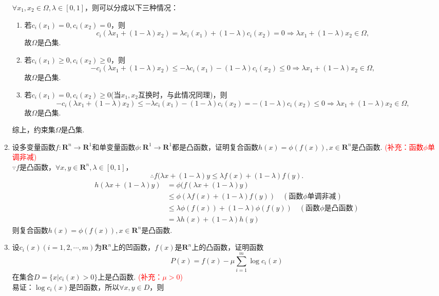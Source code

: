 \begin{enumerate}
    \pro $\forall x_1,x_2 \in \varOmega, \lambda \in [0,1]$，则可以分成以下三种情况：
    \begin{enumerate}[label=(\arabic*)]
        \item 若$c_i(x_1)=0,c_i(x_2)=0$，则
        \[c_i(\lambda x_1 + (1-\lambda)x_2) = \lambda c_i(x_1) + (1- \lambda)c_i(x_2) = 0 \Rightarrow \lambda x_1 + (1-\lambda)x_2 \in \varOmega,\]
        故$\varOmega$是凸集.
        \item 若$c_i(x_1)\geqslant 0,c_i(x_2)\geqslant 0$，则
        \[-c_i(\lambda x_1 + (1-\lambda)x_2) \leqslant -\lambda c_i(x_1) - (1- \lambda)c_i(x_2) \leqslant 0 \Rightarrow \lambda x_1 + (1-\lambda)x_2 \in \varOmega,\]
        故$\varOmega$是凸集.
        \item 若$c_i(x_1)= 0,c_i(x_2)\geqslant 0$(当$x_1,x_2$互换时，与此情况同理)，则
        \[-c_i(\lambda x_1 + (1-\lambda)x_2) \leqslant -\lambda c_i(x_1) - (1- \lambda)c_i(x_2) = - (1- \lambda)c_i(x_2) \leqslant 0 \Rightarrow \lambda x_1 + (1-\lambda)x_2 \in \varOmega,\]
        故$\varOmega$是凸集.
    \end{enumerate}
    综上，约束集$\varOmega$是凸集.
    \item 设多变量函数$f: \textbf{R}^n \to \textbf{R}^1$和单变量函数$\phi: \textbf{R}^1 \to \textbf{R}^1$都是凸函数，证明复合函数$h(x)=\phi(f(x)),x \in \textbf{R}^n$是凸函数. \textcolor{red}{(补充：函数$\phi$单调非减)}\\
    \pro $\because f$是凸函数，$\forall x,y \in \textbf{R}^n, \lambda \in [0,1]$，\[\therefore f(\lambda x+(1-\lambda)y \leqslant \lambda f(x) + (1-\lambda)f(y).\]
    \begin{align*}
        h(\lambda x+(1-\lambda)y) & =\phi(f(\lambda x+(1-\lambda)y)\\
        & \leqslant \phi(\lambda f(x) + (1-\lambda)f(y)) \quad (\text{函数}\phi\text{单调非减})\\
        & \leqslant \lambda \phi(f(x)) + (1-\lambda)\phi(f(y)) \quad (\text{函数}\phi\text{是凸函数})\\
        & = \lambda h(x) + (1-\lambda)h(y)
    \end{align*}
    则复合函数$h(x)=\phi(f(x)),x \in \textbf{R}^n$是凸函数.
    \item 设$c_i(x)(i=1,2,\cdots,m)$为$\textbf{R}^n$上的凹函数，$f(x)$是$\textbf{R}^n$上的凸函数，证明函数\[P(x)=f(x)-\mu\sum\limits_{i=1}^m \log c_i(x)\]在集合$D=\{x | c_i(x) > 0\}$上是凸函数. \textcolor{red}{(补充：$\mu>0$)}\\
    \pro 易证：$\log c_i(x)$是凹函数，所以$\forall x,y \in D$，则

\end{enumerate}
